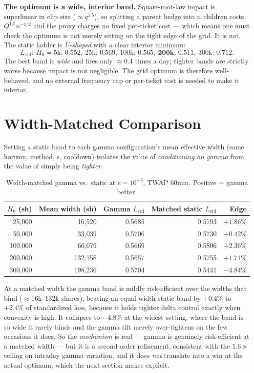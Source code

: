 \documentclass[11pt]{article}
\begin{document}
\begin{whybox}
\textbf{The optimum is a wide, interior band.} Square-root-law impact is superlinear in
clip size ($\propto q^{1.5}$), so splitting a parent hedge into $n$ children costs
$Q^{1.5}n^{-1/2}$ and the proxy charges no fixed per-ticket cost --- which means one must
check the optimum is not merely sitting on the tight edge of the grid. It is not. The
static ladder is \emph{U-shaped} with a clear interior minimum:
\[
L_{\text{std}}:\ H_0{=}5\text{k}{:}\,0.552,\ 25\text{k}{:}\,0.569,\ 100\text{k}{:}\,0.565,\
\mathbf{200\text{k}{:}\,0.511},\ 300\text{k}{:}\,0.712.
\]
The best band is \emph{wide} and fires only $\approx0.4$ times a day; tighter bands are
strictly worse because impact is not negligible. The grid optimum is therefore
well-behaved, and no external frequency cap or per-ticket cost is needed to make it interior.
\end{whybox}

\section{Width-Matched Comparison}

Setting a static band to each gamma configuration's mean effective width (same horizon,
method, $\epsilon$, cooldown) isolates the value of \emph{conditioning on gamma} from the
value of simply being \emph{tighter}.

\begin{table}[htbp]
\centering
\small
\begin{tabular}{rrrrr}
\toprule
$H_0$ (sh) & Mean width (sh) & Gamma $L_{\text{std}}$ & Matched static $L_{\text{std}}$ & Edge \\
\midrule
25{,}000  & 16{,}520  & 0.5685 & 0.5793 & $+1.86\%$ \\
50{,}000  & 33{,}039  & 0.5706 & 0.5730 & $+0.42\%$ \\
100{,}000 & 66{,}079  & 0.5669 & 0.5806 & $+2.36\%$ \\
200{,}000 & 132{,}158 & 0.5657 & 0.5755 & $+1.71\%$ \\
300{,}000 & 198{,}236 & 0.5704 & 0.5441 & $-4.84\%$ \\
\bottomrule
\end{tabular}
\caption{Width-matched gamma vs.\ static at $c = 10^{-3}$, TWAP 60min. Positive = gamma better.}
\end{table}

At a matched width the gamma band is mildly risk-efficient over the widths that bind
($\approx$16k--132k shares), beating an equal-width static band by $+0.4\%$ to $+2.4\%$ of
standardized loss, because it holds tighter delta control exactly when convexity is high. It
collapses to $-4.8\%$ at the widest setting, where the band is so wide it rarely binds and the
gamma tilt merely over-tightens on the few occasions it does. So the \emph{mechanism} is real
--- gamma is genuinely risk-efficient at a matched width --- but it is a second-order
refinement, consistent with the $1.6\times$ ceiling on intraday gamma variation, and it does
\emph{not} translate into a win at the actual optimum, which the next section makes explicit.
\end{document}
